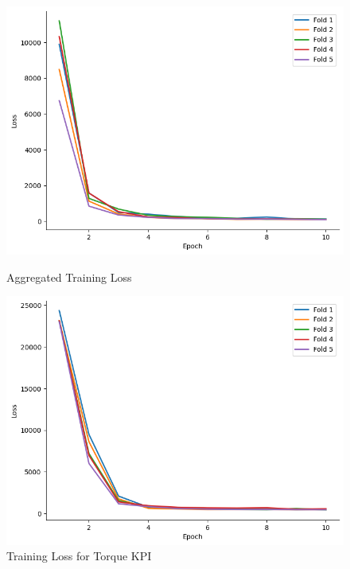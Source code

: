 \documentclass{report} %
\begin{document}
\begin{figure}[H]
    \centering
    \begin{minipage}[b]{0.325\textwidth}
        \includegraphics[width=\textwidth]{./ReportImages/train_loss.png}
        \caption{\centering Aggregated Training Loss}
        \label{fig:Aggregated Training Loss}
    \end{minipage}
    \hfill
    \begin{minipage}[b]{0.325\textwidth}
        \includegraphics[width=\textwidth]{./ReportImages/train_loss_y1.png}
        \caption{\centering Training Loss for Torque \ac{KPI}}
        \label{fig:Training Loss for Torque Curve}
    \end{minipage}
    \hfill
    \begin{minipage}[b]{0.325\textwidth}

\end{minipage}
\end{figure}
\end{document}
